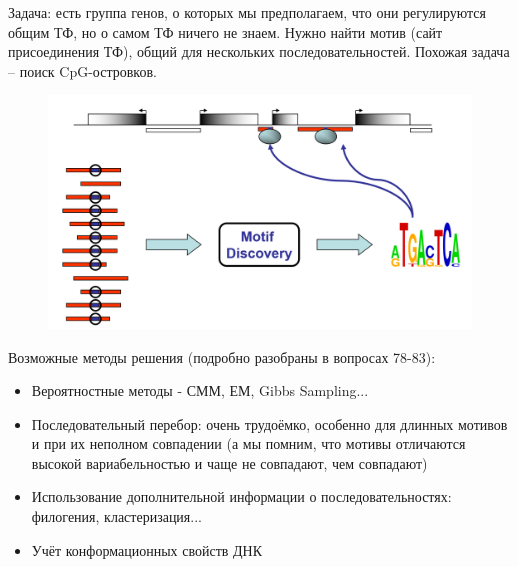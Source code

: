 \documentclass[a4paper,12pt]{article} %
\begin{document}
Задача: есть группа генов, о которых мы предполагаем, что они регулируются общим ТФ, но о самом ТФ ничего не знаем. Нужно найти мотив (сайт присоединения ТФ), общий для нескольких последовательностей. Похожая задача -- поиск CpG-островков.

\begin{figure}[H]
	\centering \includegraphics[width=.8\textwidth]{motif_discovery}
\end{figure}

Возможные методы решения (подробно разобраны в вопросах 78-83):
\begin{itemize}
	\item Вероятностные методы - СММ, ЕМ, Gibbs Sampling...
	\item Последовательный перебор: очень трудоёмко, особенно для длинных мотивов и при их неполном совпадении (а мы помним, что мотивы отличаются высокой вариабельностью и чаще не совпадают, чем совпадают)
	\item Использование дополнительной информации о последовательностях: филогения, кластеризация...
	\item Учёт конформационных свойств ДНК
\end{itemize}
\end{document}
